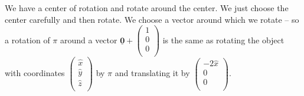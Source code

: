 \documentclass[10pt,\jkfside,a4paper]{article}
\begin{document}
\begin{enumerate}
\begin{enumerate}
{\color{blue} We have a center of rotation and rotate around the center. We
just choose the center carefully and then rotate. We choose a vector around
which we rotate -- so a rotation of $\pi$ around a vector
$\underline{\mathbf{0}} + \begin{pmatrix} 1 \\ 0 \\ 0 \\\end{pmatrix}$ is
the same as rotating the object with coordinates $\begin{pmatrix}
\hat{x} \\ \hat{y} \\ \hat{z} \\\end{pmatrix}$ by $\pi$ and
translating it by $\begin{pmatrix} -2\hat{x} \\ 0 \\ 0 \\ \end{pmatrix}$.}

\end{enumerate}

\end{enumerate}
\end{document}
